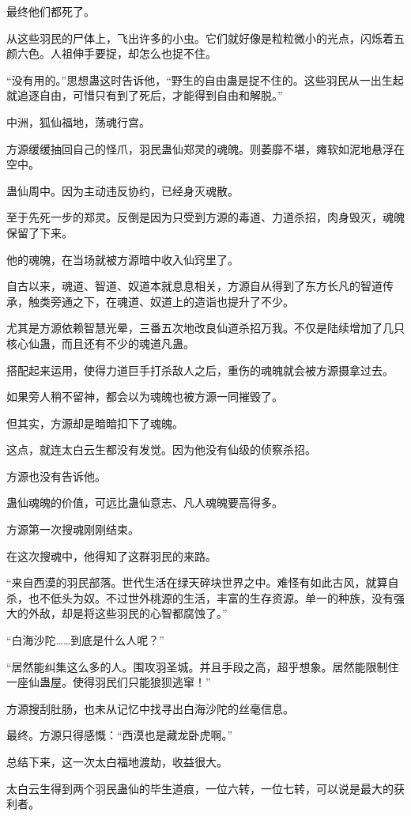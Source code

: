 \begin{this_body}
最终他们都死了。

从这些羽民的尸体上，飞出许多的小虫。它们就好像是粒粒微小的光点，闪烁着五颜六色。人祖伸手要捉，却怎么也捉不住。

“没有用的。”思想蛊这时告诉他，“野生的自由蛊是捉不住的。这些羽民从一出生起就追逐自由，可惜只有到了死后，才能得到自由和解脱。”

中洲，狐仙福地，荡魂行宫。

方源缓缓抽回自己的怪爪，羽民蛊仙郑灵的魂魄。则萎靡不堪，瘫软如泥地悬浮在空中。

蛊仙周中。因为主动违反协约，已经身灭魂散。

至于先死一步的郑灵。反倒是因为只受到方源的毒道、力道杀招，肉身毁灭，魂魄保留了下来。

他的魂魄，在当场就被方源暗中收入仙窍里了。

自古以来，魂道、智道、奴道本就息息相关，方源自从得到了东方长凡的智道传承，触类旁通之下，在魂道、奴道上的造诣也提升了不少。

尤其是方源依赖智慧光晕，三番五次地改良仙道杀招万我。不仅是陆续增加了几只核心仙蛊，而且还有不少的魂道凡蛊。

搭配起来运用，使得力道巨手打杀敌人之后，重伤的魂魄就会被方源摄拿过去。

如果旁人稍不留神，都会以为魂魄也被方源一同摧毁了。

但其实，方源却是暗暗扣下了魂魄。

这点，就连太白云生都没有发觉。因为他没有仙级的侦察杀招。

方源也没有告诉他。

蛊仙魂魄的价值，可远比蛊仙意志、凡人魂魄要高得多。

方源第一次搜魂刚刚结束。

在这次搜魂中，他得知了这群羽民的来路。

“来自西漠的羽民部落。世代生活在绿天碎块世界之中。难怪有如此古风，就算自杀，也不低头为奴。不过世外桃源的生活，丰富的生存资源。单一的种族，没有强大的外敌，却是将这些羽民的心智都腐蚀了。”

“白海沙陀……到底是什么人呢？”

“居然能纠集这么多的人。围攻羽圣城。并且手段之高，超乎想象。居然能限制住一座仙蛊屋。使得羽民们只能狼狈逃窜！”

方源搜刮肚肠，也未从记忆中找寻出白海沙陀的丝毫信息。

最终。方源只得感慨：“西漠也是藏龙卧虎啊。”

总结下来，这一次太白福地渡劫，收益很大。

太白云生得到两个羽民蛊仙的毕生道痕，一位六转，一位七转，可以说是最大的获利者。


\end{this_body}
